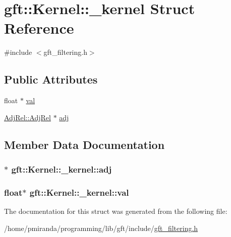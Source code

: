 \hypertarget{structgft_1_1Kernel_1_1__kernel}{}\section{gft\+:\+:Kernel\+:\+:\+\_\+kernel Struct Reference}
\label{structgft_1_1Kernel_1_1__kernel}


{\ttfamily \#include $<$gft\+\_\+filtering.\+h$>$}

\subsection*{Public Attributes}
\begin{DoxyCompactItemize}
\item 
float $\ast$ \hyperlink{structgft_1_1Kernel_1_1__kernel_af2ea14fbe3a223c113f1adf5b2a3e533}{val}
\item 
\hyperlink{namespacegft_1_1AdjRel_a832ff5521af7a9801ff18dc3ae629b68}{Adj\+Rel\+::\+Adj\+Rel} $\ast$ \hyperlink{structgft_1_1Kernel_1_1__kernel_aa0fef087eefbfa7723a44e8222608666}{adj}
\end{DoxyCompactItemize}


\subsection{Member Data Documentation}
\subsubsection[{\texorpdfstring{adj}{adj}}]{$\ast$ gft\+::\+Kernel\+::\+\_\+kernel\+::adj}\hypertarget{structgft_1_1Kernel_1_1__kernel_aa0fef087eefbfa7723a44e8222608666}{}\label{structgft_1_1Kernel_1_1__kernel_aa0fef087eefbfa7723a44e8222608666}
\subsubsection[{\texorpdfstring{val}{val}}]{\setlength{\rightskip}{0pt plus 5cm}float$\ast$ gft\+::\+Kernel\+::\+\_\+kernel\+::val}\hypertarget{structgft_1_1Kernel_1_1__kernel_af2ea14fbe3a223c113f1adf5b2a3e533}{}\label{structgft_1_1Kernel_1_1__kernel_af2ea14fbe3a223c113f1adf5b2a3e533}


The documentation for this struct was generated from the following file\+:\begin{DoxyCompactItemize}
\item 
/home/pmiranda/programming/lib/gft/include/\hyperlink{gft__filtering_8h}{gft\+\_\+filtering.\+h}\end{DoxyCompactItemize}
